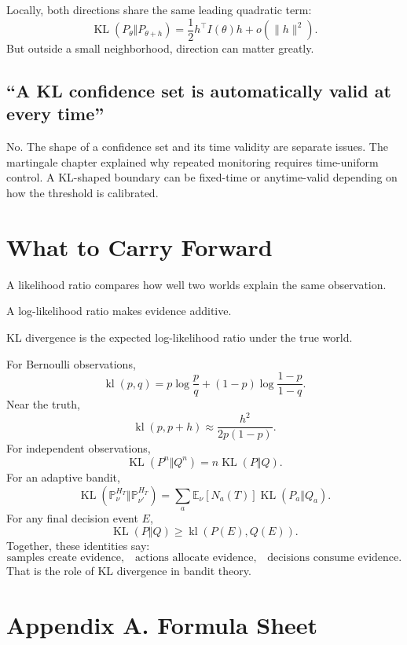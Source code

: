 \documentclass[en,nofont,11pt]{elegantbook}
\newcommand{\E}{\mathbb{E}}
\newcommand{\Pbb}{\mathbb{P}}
\newcommand{\KL}{\operatorname{KL}}
\newcommand{\kl}{\operatorname{kl}}
\begin{document}
Locally, both directions share the same leading quadratic term:
\[
\KL(P_\theta\Vert P_{\theta+h})
=
\frac12h^\top I(\theta)h+o(\|h\|^2).
\]
But outside a small neighborhood, direction can matter greatly.

\section{``A KL confidence set is automatically valid at every time''}

No. The shape of a confidence set and its time validity are separate issues. The martingale chapter explained why repeated monitoring requires time-uniform control. A KL-shaped boundary can be fixed-time or anytime-valid depending on how the threshold is calibrated.

\chapter{What to Carry Forward}

A likelihood ratio compares how well two worlds explain the same observation.

A log-likelihood ratio makes evidence additive.

KL divergence is the expected log-likelihood ratio under the true world.

For Bernoulli observations,
\[
\kl(p,q)
=
p\log\frac pq+(1-p)\log\frac{1-p}{1-q}.
\]
Near the truth,
\[
\kl(p,p+h)
\approx
\frac{h^2}{2p(1-p)}.
\]
For independent observations,
\[
\KL(P^n\Vert Q^n)=n\KL(P\Vert Q).
\]
For an adaptive bandit,
\[
\KL(\Pbb_\nu^{H_T}\Vert\Pbb_{\nu'}^{H_T})
=
\sum_a\E_\nu[N_a(T)]\KL(P_a\Vert Q_a).
\]
For any final decision event $E$,
\[
\KL(P\Vert Q)
\ge
\kl(P(E),Q(E)).
\]
Together, these identities say:
\[
\boxed{
\text{samples create evidence,}
\quad
\text{actions allocate evidence,}
\quad
\text{decisions consume evidence.}
}
\]
That is the role of KL divergence in bandit theory.

\backmatter
\chapter*{Appendix A. Formula Sheet}
\end{document}
